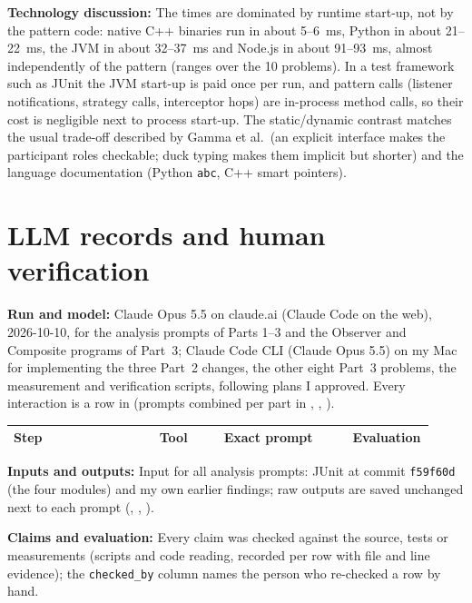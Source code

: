 \documentclass[11pt,a4paper]{article}
\newcommand{\entry}[1]{\textbf{#1:} }
\begin{document}
\entry{Technology discussion}The times are dominated by runtime start-up, not by the pattern code: native C++ binaries run in about 5--6~ms, Python in about 21--22~ms, the JVM in about 32--37~ms and Node.js in about 91--93~ms, almost independently of the pattern (ranges over the 10 problems). In a test framework such as JUnit the JVM start-up is paid once per run, and pattern calls (listener notifications, strategy calls, interceptor hops) are in-process method calls, so their cost is negligible next to process start-up. The static/dynamic contrast matches the usual trade-off described by Gamma et al.\ (an explicit interface makes the participant roles checkable; duck typing makes them implicit but shorter) and the language documentation (Python \texttt{abc}, C++ smart pointers).

\section{LLM records and human verification}
\entry{Run and model}Claude Opus 5.5 on claude.ai (Claude Code on the web), 2026-10-10, for the analysis prompts of Parts 1--3 and the Observer and Composite programs of Part~3; Claude Code CLI (Claude Opus 5.5) on my Mac for implementing the three Part~2 changes, the other eight Part~3 problems, the measurement and verification scripts, following plans I approved. Every interaction is a row in  (prompts combined per part in , , ).

{\small\renewcommand{\UrlBreaks}{\do\/\do\_}%
\begin{longtable}{@{}>{\raggedright\arraybackslash}p{0.34\linewidth}>{\raggedright\arraybackslash}p{0.15\linewidth}>{\raggedright\arraybackslash}p{0.30\linewidth}>{\raggedright\arraybackslash}p{0.13\linewidth}@{}}\toprule
Step & Tool & Exact prompt & Evaluation\\\midrule\endhead
\bottomrule\end{longtable}}

\entry{Inputs and outputs}Input for all analysis prompts: JUnit at commit \texttt{f59f60d} (the four modules) and my own earlier findings; raw outputs are saved unchanged next to each prompt (, , ).

\entry{Claims and evaluation}Every claim was checked against the source, tests or measurements (scripts and code reading, recorded per row with file and line evidence); the \texttt{checked\_by} column names the person who re-checked a row by hand.
\end{document}
